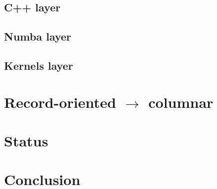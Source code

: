 \documentclass{webofc}
\begin{document}
\subsection{C++ layer}

\subsection{Numba layer}

\subsection{Kernels layer}

\section{Record-oriented $\to$ columnar}


\section{Status}

\section{Conclusion}






\end{document}
